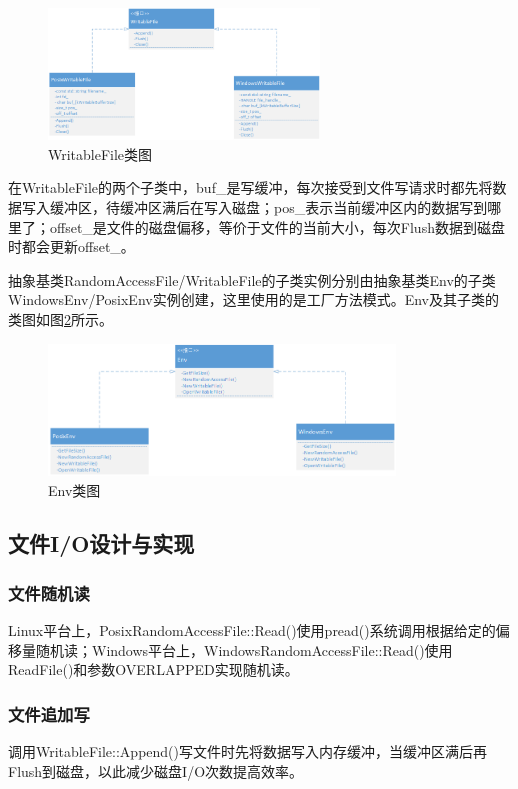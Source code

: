 \documentclass[bachelor]{thesis-uestc}
\begin{document}
\begin{figure}[htbp]
	\centering\includegraphics[height=3.5cm]{images/writablefile.png}
	\caption{WritableFile类图}
	\label{fig:writablefile}
\end{figure}

在WritableFile的两个子类中，buf\_是写缓冲，每次接受到文件写请求时都先将数据写入缓冲区，待缓冲区满后在写入磁盘；pos\_表示当前缓冲区内的数据写到哪里了；offset\_是文件的磁盘偏移，等价于文件的当前大小，每次Flush数据到磁盘时都会更新offset\_。

抽象基类RandomAccessFile/WritableFile的子类实例分别由抽象基类Env的子类WindowsEnv/PosixEnv实例创建，这里使用的是工厂方法模式。Env及其子类的类图如图\ref{fig:env}所示。

\begin{figure}[htbp]
	\centering\includegraphics[height=3.5cm]{images/env.png}
	\caption{Env类图}
	\label{fig:env}
\end{figure}

\subsection{文件I/O设计与实现}
\subsubsection{文件随机读}
Linux平台上，PosixRandomAccessFile::Read()使用pread()系统调用根据给定的偏移量随机读；Windows平台上，WindowsRandomAccessFile::Read()使用ReadFile()和参数OVERLAPPED实现随机读。

\subsubsection{文件追加写}
调用WritableFile::Append()写文件时先将数据写入内存缓冲，当缓冲区满后再Flush到磁盘，以此减少磁盘I/O次数提高效率。
\end{document}
